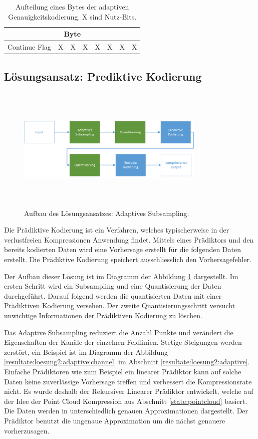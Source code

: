 \begin{table}[!htbp]
	\center
	\begin{tabular}{|c|c|c|c||c|c|c|c|}
	\hline
	\multicolumn{8}{|c|}{Byte}\\\hline
	Continue Flag & X & X & X & X & X & X & X \\\hline
	\end{tabular}
	\caption{Aufteilung eines Bytes der adaptiven Genauigkeitskodierung. X sind Nutz-Bits.}
	\label{konzept:loesung1:entropie:adaptive}
\end{table}
\pagebreak

\subsection{Lösungsansatz: Prediktive Kodierung} \label{konzept:prediktiv}
\begin{figure}[!htbp]
	\center
	\includegraphics[width=0.8\textwidth,height=6cm,keepaspectratio]{./pictures/konzept/solution2/aufbau.png}
	\caption{Aufbau des Lösungsansatzes: Adaptives Subsampling.}
	\label{konzept:loesung2:aufbau}
\end{figure}
Die Prädiktive Kodierung ist ein Verfahren, welches typischerweise in der verlustfreien Kompressionen Anwendung findet. Mittels eines Prädiktors und den bereits kodierten Daten wird eine Vorhersage erstellt für die folgenden Daten erstellt. Die Prädiktive Kodierung speichert ausschliesslich den Vorhersagefehler.

Der Aufbau dieser Lösung ist im Diagramm der Abbildung \ref{konzept:loesung2:aufbau} dargestellt. Im ersten Schritt wird ein Subsampling und eine Quantisierung der Daten durchgeführt. Darauf folgend werden die quantisierten Daten mit einer Prädiktiven Kodierung versehen. Der zweite Quantisierungsschritt versucht unwichtige Informationen der Prädiktiven Kodierung zu löschen. 

Das Adaptive Subsampling reduziert die Anzahl Punkte und verändert die Eigenschaften der Kanäle der einzelnen Feldlinien. Stetige Steigungen werden zerstört, ein Beispiel ist im Diagramm der Abbildung \ref{resultate:loesung2:adaptive:channel} im Abschnitt \ref{resultate:loesung2:adaptive}. Einfache Prädiktoren wie zum Beispiel ein linearer Prädiktor kann auf solche Daten keine zuverlässige Vorhersage treffen und verbessert die Kompressionsrate nicht. Es wurde deshalb der Rekursiver Linearer Prädiktor entwickelt, welche auf der Idee der Point Cloud Kompression aus Abschnitt \ref{state:pointcloud} basiert. Die Daten werden in unterschiedlich genauen Approximationen dargestellt. Der Prädiktor benutzt die ungenaue Approximation um die nächst genauere vorherzusagen.


